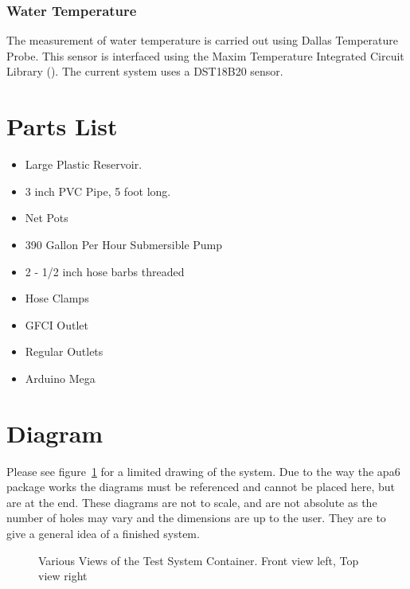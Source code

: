 \documentclass[american,12pt]{article}
\begin{document}
\subsubsection{Water Temperature}
The measurement of water temperature is carried out using Dallas Temperature
Probe. This sensor is interfaced using the Maxim Temperature Integrated Circuit
Library (\cite{gh-arduino-temperature}). The current system uses
a DST18B20 sensor.

\section{Parts List}
\begin{itemize}
    \item Large Plastic Reservoir.
    \item 3 inch PVC Pipe, 5 foot long.
    \item Net Pots
    \item 390 Gallon Per Hour Submersible Pump
    \item 2 - 1/2 inch hose barbs threaded
    \item Hose Clamps
    \item GFCI Outlet
    \item Regular Outlets
    \item Arduino Mega
\end{itemize}

\section{Diagram}
Please see figure~\ref{fig:views} for a limited drawing of the system.
Due to the way the apa6 package works the
diagrams must be referenced and cannot be placed here, but are at the end. These
diagrams are not to scale, and are not absolute as the number of holes may vary
and the dimensions are up to the user. They are to give a general idea of a
finished system.

\begin{figure}[h]
    \centering
    \caption{Various Views of the Test System Container. Front view left, Top
    view right}
    \label{fig:views}
\end{figure}
\end{document}
